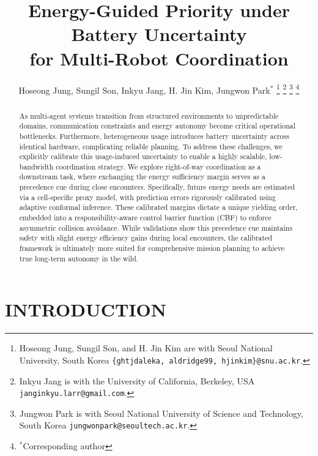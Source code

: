 \documentclass[letterpaper, 10 pt, conference]{ieeeconf}
\title{\LARGE \bf Energy-Guided Priority under Battery Uncertainty \\ for Multi-Robot Coordination}
\author{Hoseong Jung, Sungil Son, Inkyu Jang, H. Jin Kim, Jungwon Park$^{*}$
\thanks{Hoseong Jung, Sungil Son, and H. Jin Kim are with Seoul National University, South Korea
        {\tt\footnotesize \{ghtjdaleka, aldridge99, hjinkim\}@snu.ac.kr}.}       
\thanks{Inkyu Jang is with the University of California, Berkeley, USA {\tt\footnotesize janginkyu.larr@gmail.com}.}
\thanks{Jungwon Park is with Seoul National University of Science and Technology, South Korea {\tt\footnotesize jungwonpark@seoultech.ac.kr}.}
\thanks{$^*$Corresponding author}}%
\begin{document}
\maketitle


\begin{abstract}
As multi-agent systems transition from structured environments to unpredictable domains, communication constraints and energy autonomy become critical operational bottlenecks.
Furthermore, heterogeneous usage introduces battery uncertainty across identical hardware, complicating reliable planning.
To address these challenges, we explicitly calibrate this usage-induced uncertainty to enable a highly scalable, low-bandwidth coordination strategy.
We explore right-of-way coordination as a downstream task, where exchanging the energy sufficiency margin serves as a precedence cue during close encounters.
Specifically, future energy needs are estimated via a cell-specific proxy model, with prediction errors rigorously calibrated using adaptive conformal inference.
These calibrated margins dictate a unique yielding order, embedded into a responsibility-aware control barrier function (CBF) to enforce asymmetric collision avoidance.
While validations show this precedence cue maintains safety with slight energy efficiency gains during local encounters, the calibrated framework is ultimately more suited for comprehensive mission planning to achieve true long-term autonomy in the wild.

\end{abstract}

\section{INTRODUCTION}\label{sec:intro}


% 
% 
% 
\end{document}
